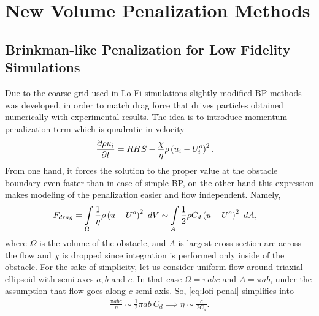 \chapter{New Volume Penalization Methods}
\label{chapter:3}
\section{Brinkman-like Penalization for Low Fidelity Simulations}
Due to the coarse grid used in Lo-Fi simulations slightly modified BP methods was developed, in order to match drag force that drives particles obtained numerically with experimental results. The idea is to introduce momentum penalization term which is quadratic in velocity
\begin{align}
\frac {\partial \rho u_i}{\partial t} &= RHS - \frac \chi \eta \rho \left(u_i - U_i^o\right)^2.
\end{align}
From one hand, it forces the solution to the proper value at the obstacle boundary even faster than in case of simple BP, on the other hand this expression makes modeling of the penalization easier and flow independent. Namely, 
\begin{align}
F_{drag} &= \int\displaylimits_\Omega \frac 1 \eta \rho \rbr{u - U^o}^2\ dV \sim \int \displaylimits_A \frac 12 \rho C_d \rbr{u - U^o}^2\ dA, \label{eq:lofi-penal}
\end{align}
where $\Omega$ is the volume of the obstacle, and $A$ is largest cross section are across the flow and $\chi$ is dropped since integration is performed only inside of the obstacle. For the sake of simplicity, let us consider uniform flow around triaxial ellipsoid with semi axes $a,b$ and $c$. In that case $\Omega = \pi a b c$ and $A = \pi a b$, under the assumption that flow goes along $c$ semi axis. So, \eqref{eq:lofi-penal} simplifies into
\begin{align}
\frac {\pi a b c}\eta \sim \frac 12 \pi a b\ C_d \implies \eta \sim \frac c{2C_d}.
\end{align}

